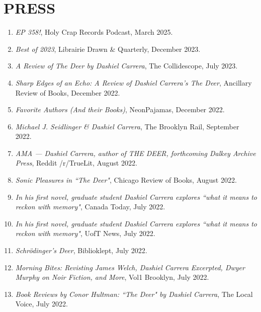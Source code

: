 \section{PRESS}
 \begin{enumerate}
    \item  \emph{EP 358!}, Holy Crap Records Podcast, March 2025. \\
    \item  \emph{Best of 2023}, Librairie Drawn \& Quarterly, December 2023. \\
   \item  \emph{A Review of The Deer by Dashiel Carrera}, The Collidescope, July 2023. \\
  \item  \emph{Sharp Edges of an Echo: A Review of Dashiel Carrera's The Deer}, Ancillary Review of Books, December 2022. \\
 \item  \emph{Favorite Authors (And their Books)}, NeonPajamas, December 2022. \\
\item  \emph{Michael J. Seidlinger \& Dashiel Carrera}, The Brooklyn Rail, September 2022. \\
\item  \emph{AMA --- Dashiel Carrera, author of THE DEER, forthcoming Dalkey Archive Press}, Reddit /r/TrueLit, August 2022. \\
\item  \emph{Sonic Pleasures in ``The Deer"}, Chicago Review of Books, August 2022. \\
 \item  \emph{In his first novel, graduate student Dashiel Carrera explores ``what it means to reckon with memory"}, Canada Today, July 2022. \\
 \item  \emph{In his first novel, graduate student Dashiel Carrera explores ``what it means to reckon with memory"}, UofT News, July 2022. \\
 \item  \emph{Schr\"odinger's Deer}, Biblioklept, July 2022. \\
\item  \emph{Morning Bites: Revisting James Welch, Dashiel Carrera Excerpted, Dwyer Murphy on Noir Fiction, and More}, Vol1 Brooklyn, July 2022. \\
\item  \emph{Book Reviews by Conor Hultman: ``The Deer" by Dashiel Carrera}, The Local Voice, July 2022. \\ 

\end{enumerate}
